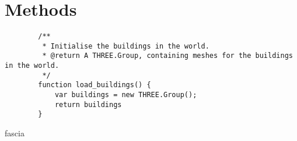 \section{Methods} %
\label{sec:methods}
    \begin{verbatim}
        /**
         * Initialise the buildings in the world.
         * @return A THREE.Group, containing meshes for the buildings in the world.
         */
        function load_buildings() {
            var buildings = new THREE.Group();
            return buildings
        }
    \end{verbatim}

fascia